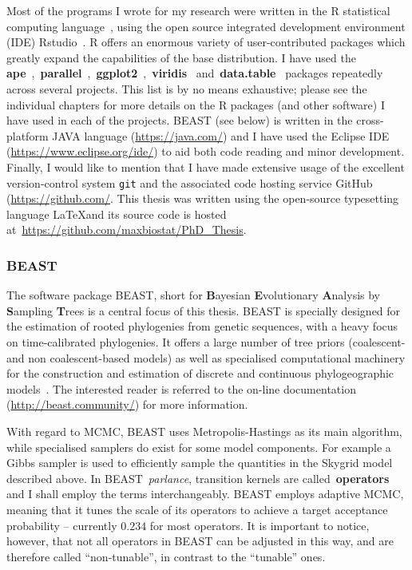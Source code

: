 Most of the programs I wrote for my research were written in the R statistical computing language~\citep{R2017}, using the open source integrated development environment (IDE) Rstudio~\citep{Rstudio2015}.
R offers an enormous variety of user-contributed packages which greatly expand the capabilities of the base distribution. 
I have used the \textbf{ape}~\citep{Paradis2004},~\textbf{parallel}~\citep{R2017},~\textbf{ggplot2}~\citep{Wickham2009},~\textbf{viridis}~\citep{Garnier2018} and~\textbf{data.table}~\citep{Dowle2017} packages repeatedly across several projects.
This list is by no means exhaustive; please see the individual chapters for more details on the R packages (and other software) I have used in each of the projects.
BEAST (see below) is written in the cross-platform JAVA language (\url{https://java.com/}) and I have used the Eclipse IDE (\url{https://www.eclipse.org/ide/}) to aid both code reading and minor development.
Finally, I would like to mention that I have made extensive usage of the excellent version-control system \verb|git| and the associated code hosting service GitHub (\url{https://github.com/}.
This thesis was written using the open-source typesetting language \LaTeX and its source code is hosted at~\url{https://github.com/maxbiostat/PhD_Thesis}.

\subsubsection{BEAST}
\label{sec:beast}

The software package BEAST, short for \textbf{B}ayesian \textbf{E}volutionary \textbf{A}nalysis by \textbf{S}ampling \textbf{T}rees\citep{Drummond2007,Drummond2012} is a central focus of this thesis.
BEAST is specially designed for the estimation of rooted phylogenies from genetic sequences, with a heavy focus on time-calibrated phylogenies.
It offers a large number of tree priors (coalescent- and non coalescent-based models) as well as specialised computational machinery for the construction and estimation of discrete and continuous phylogeographic models~\citep{Lemey2009,Lemey2010,Pybus2012,Dudas2017}.
The interested reader is referred to the on-line documentation (\url{http://beast.community/}) for more information.

With regard to MCMC, BEAST uses Metropolis-Hastings as its main algorithm, while specialised samplers do exist for some model components.
For example  a Gibbs sampler is used to efficiently sample the quantities in the Skygrid model described above.
In BEAST~\textit{parlance}, transition kernels are called~\textbf{operators} and I shall employ the terms interchangeably. 
BEAST employs adaptive MCMC, meaning that it tunes the scale of its operators to achieve a target acceptance probability -- currently $0.234$ for most operators.
It is important to notice, however, that not all operators in BEAST can be adjusted in this way, and are therefore called ``non-tunable'', in contrast to the ``tunable'' ones.

